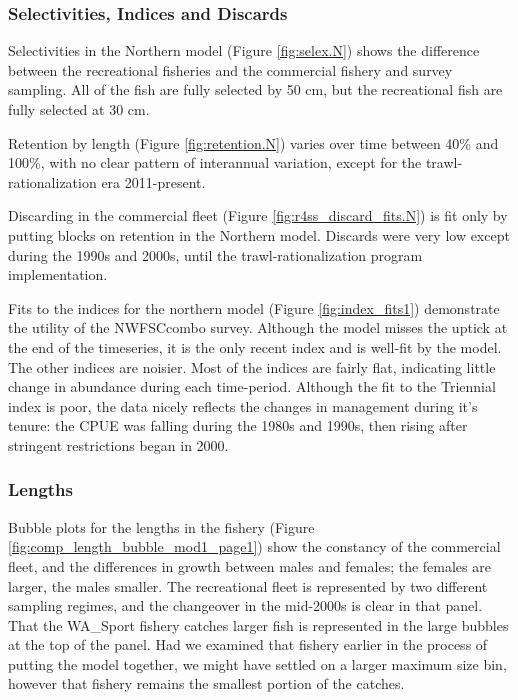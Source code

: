 \documentclass[12pt,]{article}
\begin{document}
\subsubsection{Selectivities, Indices and
Discards}\label{selectivities-indices-and-discards}

Selectivities in the Northern model (Figure \ref{fig:selex.N}) shows the
difference between the recreational fisheries and the commercial fishery
and survey sampling. All of the fish are fully selected by 50 cm, but
the recreational fish are fully selected at 30 cm.

Retention by length (Figure \ref{fig:retention.N}) varies over time
between 40\% and 100\%, with no clear pattern of interannual variation,
except for the trawl-rationalization era 2011-present.

Discarding in the commercial fleet (Figure
\ref{fig:r4ss_discard_fits.N}) is fit only by putting blocks on
retention in the Northern model. Discards were very low except during
the 1990s and 2000s, until the trawl-rationalization program
implementation.

Fits to the indices for the northern model (Figure
\ref{fig:index_fits1}) demonstrate the utility of the NWFSCcombo survey.
Although the model misses the uptick at the end of the timeseries, it is
the only recent index and is well-fit by the model. The other indices
are noisier. Most of the indices are fairly flat, indicating little
change in abundance during each time-period. Although the fit to the
Triennial index is poor, the data nicely reflects the changes in
management during it's tenure: the CPUE was falling during the 1980s and
1990s, then rising after stringent restrictions began in 2000.

\subsubsection{Lengths}\label{lengths}

Bubble plots for the lengths in the fishery (Figure
\ref{fig:comp_length_bubble_mod1_page1}) show the constancy of the
commercial fleet, and the differences in growth between males and
females; the females are larger, the males smaller. The recreational
fleet is represented by two different sampling regimes, and the
changeover in the mid-2000s is clear in that panel. That the WA\_Sport
fishery catches larger fish is represented in the large bubbles at the
top of the panel. Had we examined that fishery earlier in the process of
putting the model together, we might have settled on a larger maximum
size bin, however that fishery remains the smallest portion of the
catches.
\end{document}
